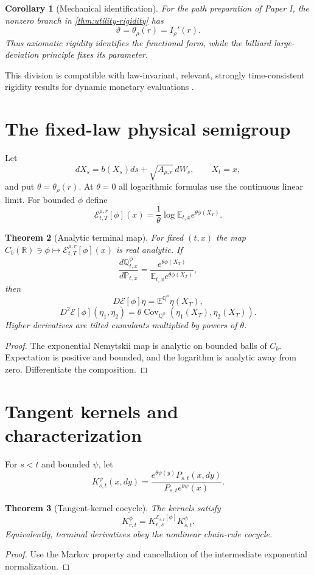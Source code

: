 \documentclass[11pt,reqno]{amsart}
\newtheorem{theorem}{Theorem}[section]
\newtheorem{corollary}[theorem]{Corollary}
\theoremstyle{definition}
\theoremstyle{remark}
\newcommand{\E}{\mathbb E}
\newcommand{\Pp}{\mathbb P}
\newcommand{\Qp}{\mathbb Q}
\newcommand{\R}{\mathbb R}
\newcommand{\cE}{\mathcal E}
\newcommand{\Cov}{\operatorname{Cov}}
\begin{document}
\begin{corollary}[Mechanical identification]\label{cor:mechanical-theta}
For the path preparation of Paper I, the nonzero branch in
\cref{thm:utility-rigidity} has
\[
 \vartheta=\theta_\rho(r)=I_\rho'(r).
\]
Thus axiomatic rigidity identifies the functional form, while the billiard
large-deviation principle fixes its parameter.
\end{corollary}

This division is compatible with law-invariant, relevant, strongly
time-consistent rigidity results for dynamic monetary evaluations
\cite{KupperSchachermayer2009}.

\section{The fixed-law physical semigroup}\label{sec:fixed-law}
Let
\[
 dX_s=b(X_s)ds+\sqrt{A_{\rho,r}}\,dW_s,
 \qquad X_t=x,
\]
and put $\theta=\theta_\rho(r)$.  At $\theta=0$ all logarithmic
formulas use the continuous linear limit.  For bounded $\phi$ define
\[
 \cE_{t,T}^{\rho,r}[\phi](x)
 =\frac1\theta\log\E_{t,x}e^{\theta\phi(X_T)}.
\]

\begin{theorem}[Analytic terminal map]\label{thm:analytic}
For fixed $(t,x)$ the map
$C_b(\R)\ni\phi\mapsto\cE_{t,T}^{\rho,r}[\phi](x)$ is real analytic.  If
\[
 \frac{d\Qp_{t,x}^{\phi}}{d\Pp_{t,x}}
 =\frac{e^{\theta\phi(X_T)}}
 {\E_{t,x}e^{\theta\phi(X_T)}},
\]
then
\[
 D\cE[\phi]\eta
 =\E^{\Qp^\phi}\eta(X_T),
\]
\[
 D^2\cE[\phi](\eta_1,\eta_2)
 =\theta\Cov_{\Qp^\phi}
 (\eta_1(X_T),\eta_2(X_T)).
\]
Higher derivatives are tilted cumulants multiplied by powers of $\theta$.
\end{theorem}
\begin{proof}
The exponential Nemytskii map is analytic on bounded balls of $C_b$.
Expectation is positive and bounded, and the logarithm is analytic away from
zero.  Differentiate the composition.
\end{proof}

\section{Tangent kernels and characterization}\label{sec:tangent}
For $s<t$ and bounded $\psi$, let
\[
 K_{s,t}^{\psi}(x,dy)
 =\frac{e^{\theta\psi(y)}P_{s,t}(x,dy)}
 {P_{s,t}e^{\theta\psi}(x)}.
\]

\begin{theorem}[Tangent-kernel cocycle]\label{thm:cocycle}
The kernels satisfy
\[
 K_{r,t}^{\phi}
 =K_{r,s}^{\cE_{s,t}[\phi]}K_{s,t}^{\phi}.
\]
Equivalently, terminal derivatives obey the nonlinear chain-rule cocycle.
\end{theorem}
\begin{proof}
Use the Markov property and cancellation of the intermediate exponential
normalization.
\end{proof}
\end{document}

